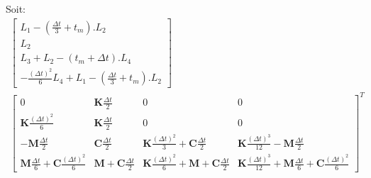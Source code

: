\documentclass[12pt,a4paper]{report}
\begin{document}
Soit:
\begin{equation}
\begin{array}{c}
	\begin{bmatrix}	
		  L_1 - \left( \frac{\Delta t}{3} + t_m \right).L_2
		\\ L_2
		\\ L_3 + L_2 - (t_m+\Delta t).L_4
		\\  -\frac{(\Delta t)^2}{6} L_4 
			+ L_1 
			- \left( \frac{\Delta t}{3} + t_m \right).L_2
	\end{bmatrix}
	\\
		\begin{bmatrix}	   
			   0
			&
		   		\mathbf{K} \frac{\Delta t}{2}
		   	&   
		   		0
			&
		   		0
		\\   
			   \mathbf{K} \frac{(\Delta t)^2}{6}
			&
		   		\mathbf{K} \frac{\Delta t}{2} 
		   	&
		   		0
			&
		   		0
		\\   
			   -\mathbf{M}
			   		\frac{\Delta t}{2}   
		   	& 
		   		\mathbf{C} \frac{\Delta t}{2}
		   	&
			   	\mathbf{K}
			   		\frac{(\Delta t)^2}{3} 
		   		+\mathbf{C} \frac{\Delta t}{2}
		   	&
		   		\mathbf{K} \frac{(\Delta t)^3}{12}
		   		-\mathbf{M}
			   		\frac{\Delta t}{2} 
		\\   
			   \mathbf{M}	\frac{ \Delta t}{6} 
			   +\mathbf{C} \frac{(\Delta t)^2}{6} 
		   	&
			   \mathbf{M} 
			   +\mathbf{C} \frac{\Delta t}{2}
		   	&
		   		\mathbf{K} \frac{(\Delta t)^2}{6} 
		   		+\mathbf{M} 
			   	+\mathbf{C} \frac{\Delta t}{2}
		   	&
		   		\mathbf{K} \frac{(\Delta t)^3}{12}
		   		+\mathbf{M} \frac{\Delta t}{6} 
			   +\mathbf{C} \frac{(\Delta t)^2}{6} 
	\end{bmatrix}^T
\end{array}
\end{equation}
\end{document}
